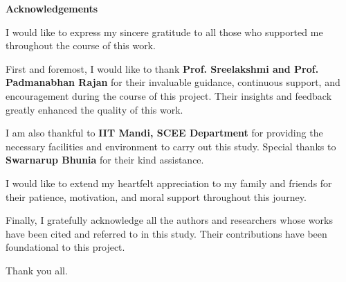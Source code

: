 \begin{flushright}
\huge{\textbf{Acknowledgements}}
\end{flushright}
I would like to express my sincere gratitude to all those who supported me throughout the course of this work. 

First and foremost, I would like to thank \textbf{Prof. Sreelakshmi and Prof. Padmanabhan Rajan} for their invaluable guidance, continuous support, and encouragement during the course of this project. Their insights and feedback greatly enhanced the quality of this work. 

I am also thankful to \textbf{IIT Mandi, SCEE Department} for providing the necessary facilities and environment to carry out this study. Special thanks to \textbf{Swarnarup Bhunia} for their kind assistance. 

I would like to extend my heartfelt appreciation to my family and friends for their patience, motivation, and moral support throughout this journey. 

Finally, I gratefully acknowledge all the authors and researchers whose works have been cited and referred to in this study. Their contributions have been foundational to this project. \\
\bigskip

\noindent Thank you all.
